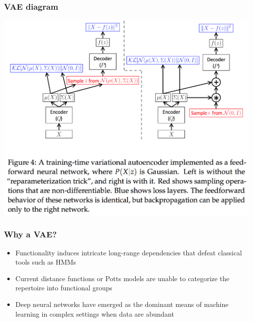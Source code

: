 \documentclass[mathserif,compress]{beamer}
\renewcommand\;{\,}
\begin{document}
\begin{frame}\frametitle{VAE diagram}
\begin{center}
\includegraphics[width=0.95\linewidth]{Images/VAE_diagram.png}
\end{center}
\end{frame}

\begin{frame}\frametitle{Why a VAE?}
\begin{itemize}
\item
Functionality induces intricate long-range dependencies that defeat classical tools such as HMMs
\bigskip
\item
Current distance functions or Potts models are unable to categorize the repertoire into functional groups
\bigskip
\item
Deep neural networks have emerged as the dominant means of machine learning in complex settings when data are abundant
\end{itemize}
\end{frame}
\end{document}
